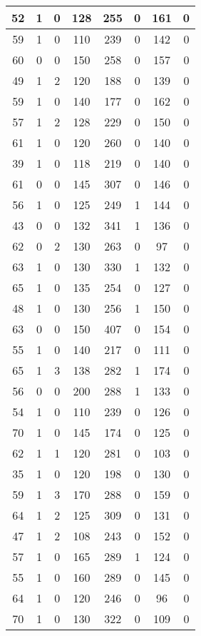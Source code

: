 \documentclass{article}
\begin{document}
\begin{longtable}{|c|c|c|c|c|c|c|c|}
52 & 1 & 0 & 128 & 255 & 0 & 161 & 0 \\ \hline
59 & 1 & 0 & 110 & 239 & 0 & 142 & 0 \\ \hline
60 & 0 & 0 & 150 & 258 & 0 & 157 & 0 \\ \hline
49 & 1 & 2 & 120 & 188 & 0 & 139 & 0 \\ \hline
59 & 1 & 0 & 140 & 177 & 0 & 162 & 0 \\ \hline
57 & 1 & 2 & 128 & 229 & 0 & 150 & 0 \\ \hline
61 & 1 & 0 & 120 & 260 & 0 & 140 & 0 \\ \hline
39 & 1 & 0 & 118 & 219 & 0 & 140 & 0 \\ \hline
61 & 0 & 0 & 145 & 307 & 0 & 146 & 0 \\ \hline
56 & 1 & 0 & 125 & 249 & 1 & 144 & 0 \\ \hline
43 & 0 & 0 & 132 & 341 & 1 & 136 & 0 \\ \hline
62 & 0 & 2 & 130 & 263 & 0 & 97 & 0 \\ \hline
63 & 1 & 0 & 130 & 330 & 1 & 132 & 0 \\ \hline
65 & 1 & 0 & 135 & 254 & 0 & 127 & 0 \\ \hline
48 & 1 & 0 & 130 & 256 & 1 & 150 & 0 \\ \hline
63 & 0 & 0 & 150 & 407 & 0 & 154 & 0 \\ \hline
55 & 1 & 0 & 140 & 217 & 0 & 111 & 0 \\ \hline
65 & 1 & 3 & 138 & 282 & 1 & 174 & 0 \\ \hline
56 & 0 & 0 & 200 & 288 & 1 & 133 & 0 \\ \hline
54 & 1 & 0 & 110 & 239 & 0 & 126 & 0 \\ \hline
70 & 1 & 0 & 145 & 174 & 0 & 125 & 0 \\ \hline
62 & 1 & 1 & 120 & 281 & 0 & 103 & 0 \\ \hline
35 & 1 & 0 & 120 & 198 & 0 & 130 & 0 \\ \hline
59 & 1 & 3 & 170 & 288 & 0 & 159 & 0 \\ \hline
64 & 1 & 2 & 125 & 309 & 0 & 131 & 0 \\ \hline
47 & 1 & 2 & 108 & 243 & 0 & 152 & 0 \\ \hline
57 & 1 & 0 & 165 & 289 & 1 & 124 & 0 \\ \hline
55 & 1 & 0 & 160 & 289 & 0 & 145 & 0 \\ \hline
64 & 1 & 0 & 120 & 246 & 0 & 96 & 0 \\ \hline
70 & 1 & 0 & 130 & 322 & 0 & 109 & 0 \\ \hline

\end{longtable}
\end{document}
